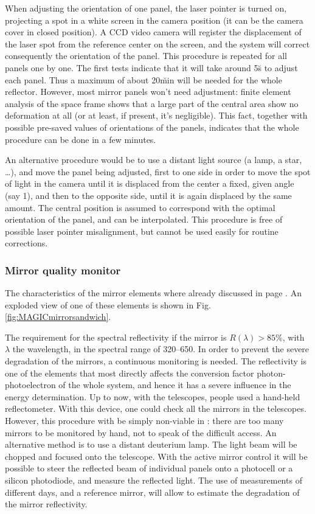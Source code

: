 When adjusting the orientation of one panel, the laser pointer is
turned on, projecting a spot in a white screen in the camera position
(it can be the camera cover in closed position). A CCD video camera
will register the displacement of the laser spot from the reference
center on the screen, and the system will correct consequently the
orientation of the panel. This procedure is repeated for all panels
one by one. The first tests \cite{MAGIC:Wacker_Kruger} indicate that
it will take around 5\u{s} to adjust each panel. Thus a maximum of
about 20\u{min} will be needed for the whole reflector. However, most
mirror panels won't need adjustment: finite element analysis of the
space frame shows that a large part of the central area show no
deformation at all (or at least, if present, it's negligible). This
fact, together with possible pre-saved values of orientations of the
panels, indicates that the whole procedure can be done in a few
minutes.

An alternative procedure would be to use a distant light source (a
lamp, a star, \ldots), and move the panel being adjusted, first to one
side in order to move the spot of light in the camera until it is
displaced from the center a fixed, given angle (say 1\deg), and then
to the opposite side, until it is again displaced by the same amount.
The central position is assumed to correspond with the optimal
orientation of the panel, and can be interpolated. This procedure is
free of possible laser pointer misalignment, but cannot be used easily
for routine corrections.

\subsubsection{Mirror quality monitor}
%
The characteristics of the mirror elements where already discussed in
page \pageref{label:mirrorelement}. An exploded view of one of these
elements is shown in Fig.  \ref{fig:MAGICmirrorsandwich}.

The requirement for the spectral reflectivity if the mirror is
$R(\lambda)>85\%$, with $\lambda$ the wavelength, in the spectral
range of 320--650. In order to prevent the severe degradation of the
mirrors, a continuous monitoring is needed. The reflectivity is one of
the elements that most directly affects the conversion factor
photon-photoelectron of the whole system, and hence it has a severe
influence in the energy determination. Up to now, with the \HEGRA
telescopes, people used a hand-held reflectometer. With this device,
one could check all the mirrors in the telescopes. However, this
procedure with be simply non-viable in \MAGIC: there are too many
mirrors to be monitored by hand, not to speak of the difficult access.
An alternative method is to use a distant deuterium lamp. The light
beam will be chopped and focused onto the telescope.  With the active
mirror control it will be possible to steer the reflected beam of
individual panels onto a photocell or a silicon photodiode, and
measure the reflected light. The use of measurements of different
days, and a reference mirror, will allow to estimate the degradation
of the mirror reflectivity.

